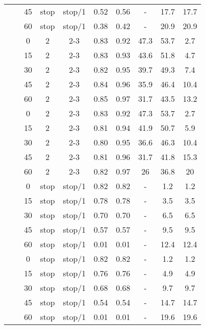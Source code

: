 \begin{longtable}[h!]{cccccccccc}
&  & 45 & stop & stop/1 & 0.52 & 0.56 & - & 17.7 & 17.7\\
\nopagebreak
\multirow{-10}{*}{\centering\arraybackslash 11} & \multirow{-5}{*}{\centering\arraybackslash 0.33} & 60 & stop & stop/1 & 0.38 & 0.42 & - & 20.9 & 20.9\\
\cmidrule{1-10}\pagebreak[0]
&  & 0 & 2 & 2-3 & 0.83 & 0.92 & 47.3 & 53.7 & 2.7\\
\nopagebreak
&  & 15 & 2 & 2-3 & 0.83 & 0.93 & 43.6 & 51.8 & 4.7\\
\nopagebreak
&  & 30 & 2 & 2-3 & 0.82 & 0.95 & 39.7 & 49.3 & 7.4\\
\nopagebreak
&  & 45 & 2 & 2-3 & 0.84 & 0.96 & 35.9 & 46.4 & 10.4\\
\nopagebreak
& \multirow{-5}{*}{\centering\arraybackslash 0.2} & 60 & 2 & 2-3 & 0.85 & 0.97 & 31.7 & 43.5 & 13.2\\
\nopagebreak
&  & 0 & 2 & 2-3 & 0.83 & 0.92 & 47.3 & 53.7 & 2.7\\
\nopagebreak
&  & 15 & 2 & 2-3 & 0.81 & 0.94 & 41.9 & 50.7 & 5.9\\
\nopagebreak
&  & 30 & 2 & 2-3 & 0.80 & 0.95 & 36.6 & 46.3 & 10.4\\
\nopagebreak
&  & 45 & 2 & 2-3 & 0.81 & 0.96 & 31.7 & 41.8 & 15.3\\
\nopagebreak
\multirow{-10}{*}{\centering\arraybackslash 12} & \multirow{-5}{*}{\centering\arraybackslash 0.33} & 60 & 2 & 2-3 & 0.82 & 0.97 & 26 & 36.8 & 20\\
\cmidrule{1-10}\pagebreak[0]
&  & 0 & stop & stop/1 & 0.82 & 0.82 & - & 1.2 & 1.2\\
\nopagebreak
&  & 15 & stop & stop/1 & 0.78 & 0.78 & - & 3.5 & 3.5\\
\nopagebreak
&  & 30 & stop & stop/1 & 0.70 & 0.70 & - & 6.5 & 6.5\\
\nopagebreak
&  & 45 & stop & stop/1 & 0.57 & 0.57 & - & 9.5 & 9.5\\
\nopagebreak
& \multirow{-5}{*}{\centering\arraybackslash 0.2} & 60 & stop & stop/1 & 0.01 & 0.01 & - & 12.4 & 12.4\\
\nopagebreak
&  & 0 & stop & stop/1 & 0.82 & 0.82 & - & 1.2 & 1.2\\
\nopagebreak
&  & 15 & stop & stop/1 & 0.76 & 0.76 & - & 4.9 & 4.9\\
\nopagebreak
&  & 30 & stop & stop/1 & 0.68 & 0.68 & - & 9.7 & 9.7\\
\nopagebreak
&  & 45 & stop & stop/1 & 0.54 & 0.54 & - & 14.7 & 14.7\\
\nopagebreak
\multirow{-10}{*}{\centering\arraybackslash 13} & \multirow{-5}{*}{\centering\arraybackslash 0.33} & 60 & stop & stop/1 & 0.01 & 0.01 & - & 19.6 & 19.6\\

\end{longtable}

